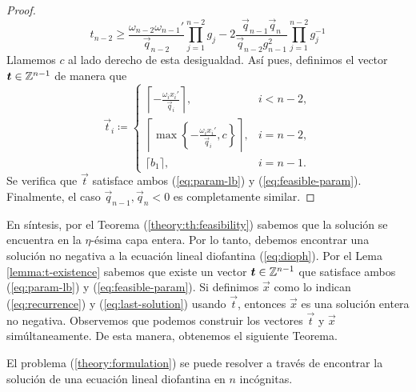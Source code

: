\begin{proof}
	\begin{equation*}
		t_{n-2} \geq \frac{\omega_{n-2}\omega_{n-1}'}{\vec{q}_{n-2}}\prod_{j=1}^{n-2}g_j
		- 2\frac{\vec{q}_{n-1}\vec{q}_n}{\vec{q}_{n-2}g_{n-1}^2}
		\prod_{j=1}^{n-2}g_j^{-1}
	\end{equation*}
	Llamemos $c$ al lado derecho de esta desigualdad. Así pues, definimos el vector
	$\boldsymbol{t} \in \mathbb{Z}^{n-1}$ de manera que
	\begin{equation*}
		\vec{t}_i \coloneq \begin{cases}
			\left\lceil -\frac{\omega_i x_i'}{\vec{q}_i} \right\rceil, & i < n - 2, \\[1em]
			\left\lceil \max\left\lbrace -\frac{\omega_ix_i'}{\vec{q}_i}, c \right\rbrace
			\right\rceil, & i = n -2, \\[0.8em]
			\lceil b_1 \rceil, & i = n - 1.
		\end{cases}
	\end{equation*}
	Se verifica que $\vec{t}$ satisface ambos (\ref{eq:param-lb}) y (\ref{eq:feasible-param}).
	Finalmente, el caso $\vec{q}_{n-1}, \vec{q}_n < 0$ es completamente similar.
\end{proof}

En síntesis, por el Teorema (\ref{theory:th:feasibility}) sabemos que la solución se encuentra en
la $\eta$-ésima capa entera. Por lo tanto, debemos encontrar una solución no negativa a la ecuación
lineal diofantina (\ref{eq:dioph}). Por el Lema \ref{lemma:t-existence} sabemos que existe un vector
$\boldsymbol{t} \in \mathbb{Z}^{n-1}$ que satisface ambos (\ref{eq:param-lb}) y (\ref{eq:feasible-param}). Si
definimos $\vec{x}$ como lo indican (\ref{eq:recurrence}) y (\ref{eq:last-solution}) usando
$\vec{t}$, entonces $\vec{x}$ es una solución entera no negativa. Observemos que podemos construir
los vectores $\vec{t}$ y $\vec{x}$ simúltaneamente. De esta manera, obtenemos el siguiente Teorema.

\begin{theorem}
	El problema (\ref{theory:formulation}) se puede resolver a través de encontrar la solución de
	una ecuación lineal diofantina en $n$ incógnitas.
\end{theorem}

